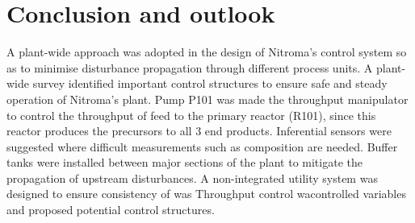 \section{Conclusion and outlook}
A plant-wide approach was adopted in the design of Nitroma's control system so as to minimise disturbance propagation through different process units. A plant-wide survey identified important control structures to ensure safe and steady operation of Nitroma's plant. Pump P101 was made the throughput manipulator to control the throughput of feed to the primary reactor (R101), since this reactor produces the precursors to all 3 end products. Inferential sensors were suggested where difficult measurements such as composition are needed. Buffer tanks were installed between major sections of the plant to mitigate the propagation of upstream disturbances. A non-integrated utility system was designed to ensure consistency of  was Throughput control wacontrolled variables and proposed potential control structures.